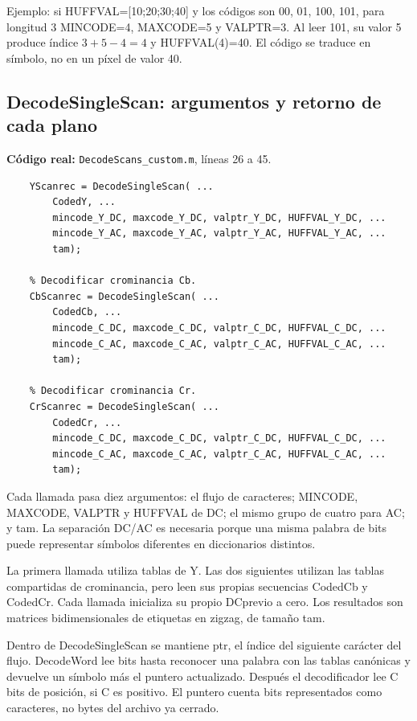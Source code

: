 \documentclass[11pt,a4paper,oneside]{report}
\begin{document}
Ejemplo: si HUFFVAL=[10;20;30;40] y los códigos son 00, 01, 100, 101,
para longitud 3 MINCODE=4, MAXCODE=5 y VALPTR=3. Al leer 101, su valor 5
produce índice $3+5-4=4$ y HUFFVAL(4)=40. El código se traduce en símbolo,
no en un píxel de valor 40.


\par\medskip\noindent\begin{minipage}{\linewidth}

\subsection{DecodeSingleScan: argumentos y retorno de cada plano}

\textbf{Código real:} \texttt{DecodeScans\_custom.m}, líneas 26 a 45.

\begin{lstlisting}[firstnumber=26]
    % Decodificar luminancia.
    YScanrec = DecodeSingleScan( ...
        CodedY, ...
        mincode_Y_DC, maxcode_Y_DC, valptr_Y_DC, HUFFVAL_Y_DC, ...
        mincode_Y_AC, maxcode_Y_AC, valptr_Y_AC, HUFFVAL_Y_AC, ...
        tam);

    % Decodificar crominancia Cb.
    CbScanrec = DecodeSingleScan( ...
        CodedCb, ...
        mincode_C_DC, maxcode_C_DC, valptr_C_DC, HUFFVAL_C_DC, ...
        mincode_C_AC, maxcode_C_AC, valptr_C_AC, HUFFVAL_C_AC, ...
        tam);

    % Decodificar crominancia Cr.
    CrScanrec = DecodeSingleScan( ...
        CodedCr, ...
        mincode_C_DC, maxcode_C_DC, valptr_C_DC, HUFFVAL_C_DC, ...
        mincode_C_AC, maxcode_C_AC, valptr_C_AC, HUFFVAL_C_AC, ...
        tam);
\end{lstlisting}

\end{minipage}\par


Cada llamada pasa diez argumentos: el flujo de caracteres; MINCODE, MAXCODE,
VALPTR y HUFFVAL de DC; el mismo grupo de cuatro para AC; y tam. La separación
DC/AC es necesaria porque una misma palabra de bits puede representar
símbolos diferentes en diccionarios distintos.

La primera llamada utiliza tablas de Y. Las dos siguientes utilizan las
tablas compartidas de crominancia, pero leen sus propias secuencias CodedCb
y CodedCr. Cada llamada inicializa su propio DCprevio a cero. Los resultados
son matrices bidimensionales de etiquetas en zigzag, de tamaño tam.

Dentro de DecodeSingleScan se mantiene ptr, el índice del siguiente carácter
del flujo. DecodeWord lee bits hasta reconocer una palabra con las tablas
canónicas y devuelve un símbolo más el puntero actualizado. Después el
decodificador lee C bits de posición, si C es positivo. El puntero cuenta
bits representados como caracteres, no bytes del archivo ya cerrado.
\end{document}
